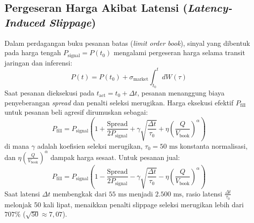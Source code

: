 \documentclass[journal,compsoc]{IEEEtran}
\begin{document}
\subsection{Pergeseran Harga Akibat Latensi (\textit{Latency-Induced Slippage})}
Dalam perdagangan buku pesanan batas (\textit{limit order book}), sinyal yang dibentuk pada harga tengah $P_{\text{signal}} = P(t_0)$ mengalami pergeseran harga selama transit jaringan dan inferensi:
\begin{equation}
P(t) = P(t_0) + \sigma_{\text{market}} \int_{t_0}^{t} dW(\tau)
\end{equation}
Saat pesanan dieksekusi pada $t_{\text{act}} = t_0 + \Delta t$, pesanan menanggung biaya penyeberangan \textit{spread} dan penalti seleksi merugikan. Harga eksekusi efektif $P_{\text{fill}}$ untuk pesanan beli agresif dirumuskan sebagai:
\begin{equation}
P_{\text{fill}} = P_{\text{signal}} \left( 1 + \frac{\text{Spread}}{2 P_{\text{signal}}} + \gamma \sqrt{\frac{\Delta t}{\tau_0}} + \eta \left(\frac{Q}{V_{\text{book}}}\right)^\alpha \right)
\end{equation}
di mana $\gamma$ adalah koefisien seleksi merugikan, $\tau_0 = 50 \text{ ms}$ konstanta normalisasi, dan $\eta \left(\frac{Q}{V_{\text{book}}}\right)^\alpha$ dampak harga sesaat. Untuk pesanan jual:
\begin{equation}
P_{\text{fill}} = P_{\text{signal}} \left( 1 - \frac{\text{Spread}}{2 P_{\text{signal}}} - \gamma \sqrt{\frac{\Delta t}{\tau_0}} - \eta \left(\frac{Q}{V_{\text{book}}}\right)^\alpha \right)
\end{equation}
Saat latensi $\Delta t$ membengkak dari $55 \text{ ms}$ menjadi $2.500 \text{ ms}$, rasio latensi $\frac{\Delta t}{\tau_0}$ melonjak 50 kali lipat, menaikkan penalti slippage seleksi merugikan lebih dari $707\%$ ($\sqrt{50} \approx 7,07$).
\end{document}
